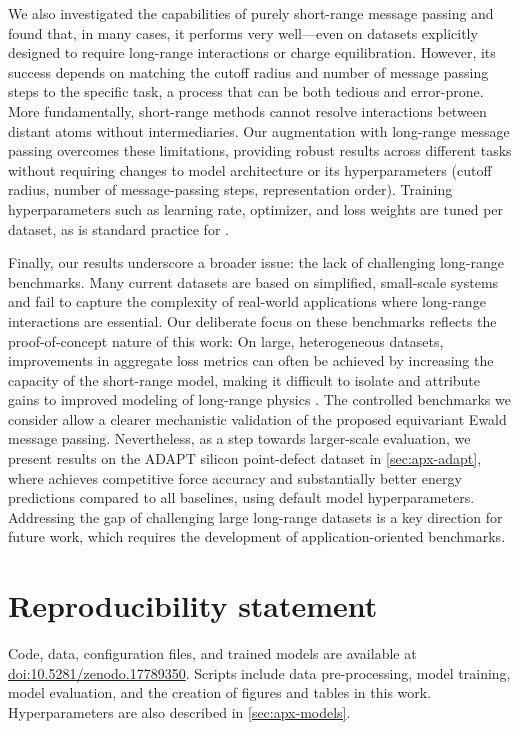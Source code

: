 \documentclass[10pt]{article} %
\newcommand{\CL}[1]{#1}
\newcommand{\ML}[1]{#1}
\begin{document}
We also investigated the capabilities of purely short-range message passing and found that, in many cases, it performs very well—even on datasets explicitly designed to require long-range interactions or charge equilibration. However, its success depends on matching the cutoff radius and number of message passing steps to the specific task, a process that can be both tedious and error-prone. More fundamentally, short-range methods cannot resolve interactions between distant atoms without intermediaries.
Our augmentation with long-range message passing overcomes these limitations, \CL{providing robust results across different tasks without requiring changes to model architecture or its hyperparameters (cutoff radius, number of message-passing steps, representation order). Training hyperparameters such as learning rate, optimizer, and loss weights are tuned per dataset, as is standard practice for \mlps}.

Finally, our results underscore a broader issue: the lack of challenging long-range benchmarks. Many current datasets are based on simplified, small-scale systems and fail to capture the complexity of real-world applications where long-range interactions are essential. \CL{Our deliberate focus on these benchmarks reflects the proof-of-concept nature of this work: On large, heterogeneous datasets, improvements in aggregate loss metrics can often be achieved by increasing the capacity of the short-range model, making it difficult to isolate and attribute gains to improved modeling of long-range physics \citep{hlhc2023}. The controlled benchmarks we consider allow a clearer mechanistic validation of the proposed equivariant Ewald message passing. Nevertheless, as a step towards larger-scale evaluation, we present results on the ADAPT silicon point-defect dataset \citep{dxzhrjk2025pre} in \cref{sec:apx-adapt}, where \lorem achieves competitive force accuracy and substantially better energy predictions compared to all baselines, using default model hyperparameters.}
Addressing \ML{the gap of challenging large long-range datasets} is a key direction for future work, which requires the development of application-oriented benchmarks.

\section*{Reproducibility statement}
\noindent
Code, data, configuration files, and trained models are available at \href{https://doi.org/10.5281/zenodo.17789350}{doi:10.5281/zenodo.17789350}. Scripts include data pre-processing, model training, model evaluation, and the creation of figures and tables in this work. Hyperparameters are also described in \cref{sec:apx-models}.
\end{document}
